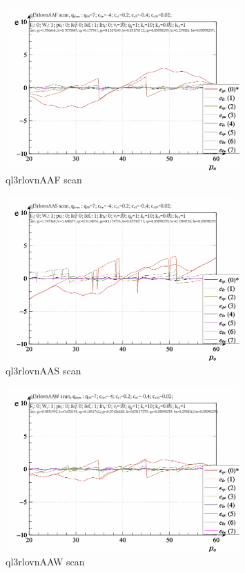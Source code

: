 \documentclass[a4paper,10pt]{article}
\begin{document}
\begin{figure}[htb!]
  \centerline{
    \includegraphics[width=0.8\textwidth]{qls-p_p_e_ql3rlovnAAF_scan.png}
  }
  \caption{ql3rlovnAAF scan}
  \label{atu:f:ql3rlovnAAF_scan}
\end{figure}

\begin{figure}[htb!]
  \centerline{
    \includegraphics[width=0.8\textwidth]{qls-p_p_e_ql3rlovnAAS_scan.png}
  }
  \caption{ql3rlovnAAS scan}
  \label{atu:f:ql3rlovnAAS_scan}
\end{figure}

\begin{figure}[htb!]
  \centerline{
    \includegraphics[width=0.8\textwidth]{qls-p_p_e_ql3rlovnAAW_scan.png}
  }
  \caption{ql3rlovnAAW scan}
  \label{atu:f:ql3rlovnAAW_scan}
\end{figure}
\end{document}
